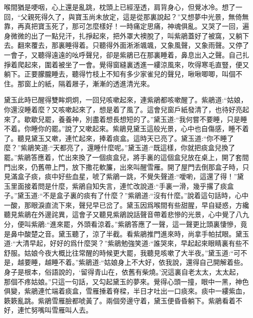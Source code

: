 \begin{parag}
    喉間猶是哽咽，心上還是亂跳，枕頭上已經溼透，肩背身心，但覺冰冷。想了一回，“父親死得久了，與寶玉尚未放定，這是從那裏說起？”又想夢中光景，無倚無靠，再真把寶玉死了，那可怎麼樣好！一時痛定思痛，神魂俱亂。又哭了一回，遍身微微的出了一點兒汗，扎掙起來，把外罩大襖脫了，叫紫鵑蓋好了被窩，又躺下去。翻來覆去，那裏睡得着。只聽得外面淅淅颯颯，又象風聲，又象雨聲。又停了一會子，又聽得遠遠的吆呼聲兒，卻是紫鵑已在那裏睡着，鼻息出入之聲。自己扎掙着爬起來，圍着被坐了一會。覺得窗縫裏透進一縷涼風來，吹得寒毛直豎，便又躺下。正要朦朧睡去，聽得竹枝上不知有多少家雀兒的聲兒，啾啾唧唧，叫個不住。那窗上的紙，隔着屜子，漸漸的透進清光來。
\end{parag}


\begin{parag}
    黛玉此時已醒得雙眸炯炯，一回兒咳嗽起來，連紫鵑都咳嗽醒了。紫鵑道:“姑娘，你還沒睡着麼？又咳嗽起來了，想是着了風了。這會兒窗戶紙發清了，也待好亮起來了。歇歇兒罷，養養神，別盡着想長想短的了。”黛玉道:“我何嘗不要睡，只是睡不着。你睡你的罷。”說了又嗽起來。紫鵑見黛玉這般光景，心中也自傷感，睡不着了。聽見黛玉又嗽，連忙起來，捧着痰盒。這時天已亮了。黛玉道:“你不睡了麼？”紫鵑笑道:“天都亮了，還睡什麼呢。”黛玉道:“既這樣，你就把痰盒兒換了罷。”紫鵑答應着，忙出來換了一個痰盒兒，將手裏的這個盒兒放在桌上，開了套間門出來，仍舊帶上門，放下撒花軟簾，出來叫醒雪雁。開了屋門去倒那盒子時，只見滿盒子痰，痰中好些血星，唬了紫鵑一跳，不覺失聲道:“噯喲，這還了得！”黛玉里面接着問是什麼，紫鵑自知失言，連忙改說道:“手裏一滑，幾乎撂了痰盒子。”黛玉道:“不是盒子裏的痰有了什麼？”紫鵑道:“沒有什麼。”說着這句話時，心中一酸，那眼淚直流下來，聲兒早已岔了。黛玉因爲喉間有些甜腥，早自疑惑，方纔聽見紫鵑在外邊詫異，這會子又聽見紫鵑說話聲音帶着悲慘的光景，心中覺了八九分，便叫紫鵑:“進來罷，外頭看涼着。”紫鵑答應了一聲，這一聲更比頭裏悽慘，竟是鼻中酸楚之音。黛玉聽了，涼了半截。看紫鵑推門進來時，尚拿手帕拭眼。黛玉道:“大清早起，好好的爲什麼哭？”紫鵑勉強笑道:“誰哭來，早起起來眼睛裏有些不舒服。姑娘今夜大概比往常醒的時候更大罷，我聽見咳嗽了大半夜。”黛玉道:“可不是，越要睡，越睡不着。”紫鵑道:“姑娘身上不大好，依我說，還得自己開解着些。身子是根本，俗語說的，‘留得青山在，依舊有柴燒。’況這裏自老太太，太太起，那個不疼姑娘。”只這一句話，又勾起黛玉的夢來。覺得心頭一撞，眼中一黑，神色俱變，紫鵑連忙端着痰盒，雪雁捶着脊樑，半日才吐出一口痰來。痰中一縷紫血，簌簌亂跳。紫鵑雪雁臉都唬黃了。兩個旁邊守着，黛玉便昏昏躺下。紫鵑看着不好，連忙努嘴叫雪雁叫人去。
\end{parag}


